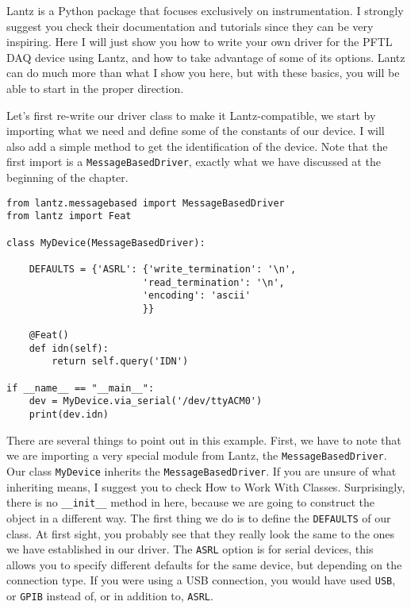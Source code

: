 Lantz is a Python package that focuses exclusively on instrumentation. I
strongly suggest you check their documentation and tutorials since they
can be very inspiring. Here I will just show you how to write your own
driver for the {PFTL} {DAQ} device using Lantz, and how to take
advantage of some of its options. Lantz can do much more than what I
show you here, but with these basics, you will be able to start in the
proper direction.

Let's first re-write our driver class to make it Lantz-compatible, we
start by importing what we need and define some of the constants of our
device. I will also add a simple method to get the identification of the
device. Note that the first import is a \texttt{MessageBasedDriver},
exactly what we have discussed at the beginning of the chapter.

\begin{verbatim}
from lantz.messagebased import MessageBasedDriver
from lantz import Feat

class MyDevice(MessageBasedDriver):

    DEFAULTS = {'ASRL': {'write_termination': '\n',
                        'read_termination': '\n',
                        'encoding': 'ascii'
                        }}

    @Feat()
    def idn(self):
        return self.query('IDN')

if __name__ == "__main__":
    dev = MyDevice.via_serial('/dev/ttyACM0')
    print(dev.idn)
\end{verbatim}

There are several things to point out in this example. First, we have to
note that we are importing a very special module from Lantz, the
\texttt{MessageBasedDriver}. Our class \texttt{MyDevice} inherits the
\texttt{MessageBasedDriver}. If you are unsure of what inheriting means,
I suggest you to check How to Work With Classes. Surprisingly, there is
no \texttt{\_\_init\_\_} method in here, because we are going to
construct the object in a different way. The first thing we do is to
define the \texttt{DEFAULTS} of our class. At first sight, you probably
see that they really look the same to the ones we have established in
our driver. The \texttt{ASRL} option is for serial devices, this allows
you to specify different defaults for the same device, but depending on
the connection type. If you were using a {USB} connection, you would
have used \texttt{USB}, or
\texttt{GPIB} instead of, or in
addition to, \texttt{ASRL}.

